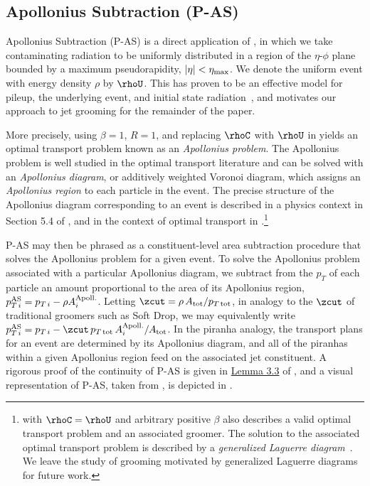 \documentclass[letterpaper,11pt]{article}
\begin{document}
\subsection{Apollonius Subtraction (P-AS)}
\label{sec:as}

Apollonius Subtraction (P-AS) is a direct application of , in which we take contaminating radiation to be uniformly distributed in a region of the \(\eta\)-\(\phi\) plane bounded by a maximum pseudorapidity, \(|\eta| < \eta_{\rm max}\).
%
We denote the uniform event with energy density \(\rho\) by \(\rhoU\).
%
This has proven to be an effective model for pileup, the underlying event, and initial state radiation~\cite{Soyez:2018opl,Monk:2018clo,Sjostrand:1987su,Sjostrand:2014zea,Dasgupta:2007wa,Kirchgaesser:2020poq,Moraes:2007rq,CDF:2015txs,Larkoski:2021hee,Baron:2020xoi,Marzani:2017kqd}, and motivates our approach to jet grooming for the remainder of the paper.

More precisely, using \(\beta = 1\), \(R =1\), and replacing \(\rhoC\) with \(\rhoU\) in  yields an optimal transport problem known as an \textit{Apollonius problem}.
%
The Apollonius problem is well studied in the optimal transport literature and can be solved with an \textit{Apollonius diagram}, or additively weighted Voronoi diagram, which assigns an \textit{Apollonius region} to each particle in the event.
%
The precise structure of the Apollonius diagram corresponding to an event is described in a physics context in Section 5.4 of , and in the context of optimal transport in .\footnote{
 with \(\rhoC = \rhoU\) and arbitrary positive \(\beta\) also describes a valid optimal transport problem and an associated \PIRANHA{} groomer.
%
The solution to the associated optimal transport problem is described by a \textit{generalized Laguerre diagram}~\cite{Komiske:2020qhg, bourne2018semidiscrete}.
%
We leave the study of \PIRANHA{} grooming motivated by generalized Laguerre diagrams for future work.
}

P-AS may then be phrased as a constituent-level area subtraction procedure that solves the Apollonius problem for a given event.
%
To solve the Apollonius problem associated with a particular Apollonius diagram, we subtract from the \(p_T\) of each particle an amount proportional to the area of its Apollonius region,
\(p_{T\,i}^{\rm AS} = p_{T\,i} - \rho A_i^{\rm Apoll.}\).
%
Letting \(\zcut = \rho \, A_{\rm tot} / p_{T\,{\rm tot}}\), in analogy to the \(\zcut\) of traditional groomers such as Soft Drop, we may equivalently write
\(p_{T\,i}^{\rm AS} = p_{T\,i} - \zcut\,p_{T\,{\rm tot}}\,A_i^{\rm Apoll.} / A_{\rm tot}\).
%
In the piranha analogy, the transport plans for an event are determined by its Apollonius diagram, and all of the piranhas within a given Apollonius region feed on the associated jet constituent.
%
A rigorous proof of the continuity of P-AS is given in \href{https://arxiv.org/pdf/1706.07403.pdf#page=15&zoom=100,0,200}{Lemma 3.3} of , and a visual representation of P-AS, taken from , is depicted in .
\end{document}

